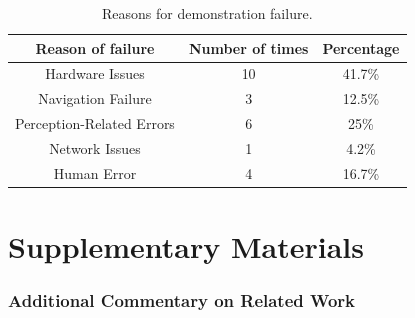 \documentclass[12pt]{article}
\begin{document}
\begin{table}[H]
\centering
\begin{tabular}{|c|c|c|}
\hline
\textbf{Reason of failure} & \textbf{Number of times} & \textbf{Percentage}\\ 
\hline
Hardware Issues & 10 & 41.7\% \\ 
\hline
Navigation Failure & 3 & 12.5\% \\ 
\hline
Perception-Related Errors & 6 & 25\% \\ 
\hline
Network Issues & 1 & 4.2\% \\ 
\hline
Human Error & 4 & 16.7\% \\ 
\hline
\end{tabular}
\caption{Reasons for demonstration failure.}
\label{table:errors}
\end{table}

\part*{Supplementary Materials}


\section{Additional Commentary on Related Work}\label{sec:related-work}
%
%
\end{document}
